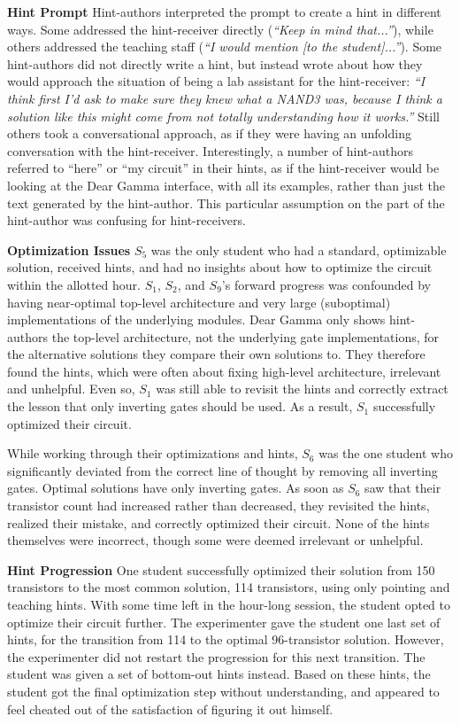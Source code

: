{\bf Hint Prompt} Hint-authors interpreted the prompt to create a hint in different ways. Some addressed the hint-receiver directly ({\it ``Keep in mind that...''}), while others addressed the teaching staff ({\it ``I would mention [to the student]...''}). Some hint-authors did not directly write a hint, but instead wrote about how they would approach the situation of being a lab assistant for the hint-receiver: {\it ``I think first I'd ask to make sure they knew what a NAND3 was, because I think a solution like this might come from not totally understanding how it works.''} Still others took a conversational approach, as if they were having an unfolding conversation with the hint-receiver. Interestingly, a number of hint-authors referred to ``here'' or ``my circuit'' in their hints, as if the hint-receiver would be looking at the Dear Gamma interface, with all its examples, rather than just the text generated by the hint-author. This particular assumption on the part of the hint-author was confusing for hint-receivers.

{\bf Optimization Issues} $S_5$ was the only student who had a standard, optimizable solution, received hints, and had no insights about how to optimize the circuit within the allotted hour. $S_1$, $S_2$, and $S_9$'s forward progress was confounded by having near-optimal top-level architecture and very large (suboptimal) implementations of the underlying modules. Dear Gamma only shows hint-authors the top-level architecture, not the underlying gate implementations, for the alternative solutions they compare their own solutions to. They therefore found the hints, which were often about fixing high-level architecture, irrelevant and unhelpful. Even so, $S_1$ was still able to revisit the hints and correctly extract the lesson that only inverting gates should be used. As a result, $S_1$ successfully optimized their circuit.

While working through their optimizations and hints, $S_6$ was the one student who significantly deviated from the correct line of thought by removing all inverting gates. Optimal solutions have only inverting gates. As soon as $S_6$ saw that their transistor count had increased rather than decreased, they revisited the hints, realized their mistake, and correctly optimized their circuit. None of the hints themselves were incorrect, though some were deemed irrelevant or unhelpful.

{\bf Hint Progression} One student successfully optimized their solution from 150 transistors to the most common solution, 114 transistors, using only pointing and teaching hints. With some time left in the hour-long session, the student opted to optimize their circuit further. The experimenter gave the student one last set of hints, for the transition from 114 to the optimal 96-transistor solution. However, the experimenter did not restart the progression for this next transition. The student was given a set of bottom-out hints instead. Based on these hints, the student got the final optimization step without understanding, and appeared to feel cheated out of the satisfaction of figuring it out himself. 

